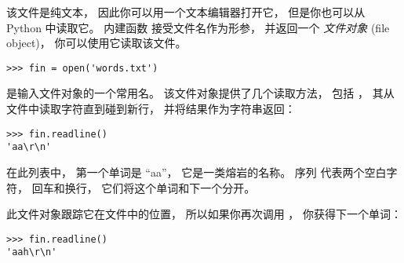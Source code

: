   


该文件是纯文本， 因此你可以用一个文本编辑器打开它， 但是你也可以从 Python 中读取它。   内建函数  接受文件名作为形参， 并返回一个 {\em 文件对象} (file object)， 你可以使用它读取该文件。

  
  
  

\begin{lstlisting}
>>> fin = open('words.txt')
\end{lstlisting}

  
  

 是输入文件对象的一个常用名。
该文件对象提供了几个读取方法， 包括 ， 其从文件中读取字符直到碰到新行， 并将结果作为字符串返回：

\begin{lstlisting}
>>> fin.readline()
'aa\r\n'
\end{lstlisting}


在此列表中， 第一个单词是 ``aa''， 它是一类熔岩的名称。   序列 \li{\r\n} 代表两个空白字符， 回车和换行， 它们将这个单词和下一个分开。


此文件对象跟踪它在文件中的位置，
所以如果你再次调用 ， 你获得下一个单词：

\begin{lstlisting}
>>> fin.readline()
'aah\r\n'
\end{lstlisting}

